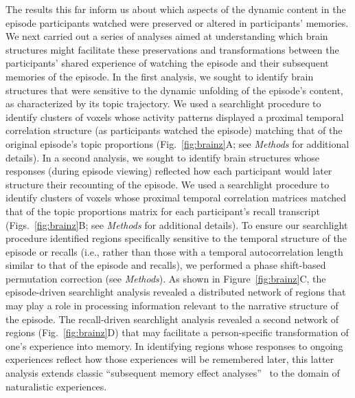 \documentclass[10pt]{article}
\begin{document}
The results this far inform us about which aspects of the dynamic content in the episode participants watched were preserved or altered in participants' memories.  We next carried out a series of analyses aimed at understanding which brain structures might facilitate these preservations and transformations between the participants' shared experience of watching the episode and their subsequent memories of the episode.  In the first analysis, we sought to identify brain structures that were sensitive to the dynamic unfolding of the episode's content, as characterized by its topic trajectory.  We used a searchlight procedure to identify clusters of voxels whose activity patterns displayed a proximal temporal correlation structure (as participants watched the episode) matching that of the original episode's topic proportions (Fig.~\ref{fig:brainz}A; see \textit{Methods} for additional details).  In a second analysis, we sought to identify brain structures whose responses (during episode viewing) reflected how each participant would later structure their recounting of the episode.  We used a searchlight procedure to identify clusters of voxels whose proximal temporal correlation matrices matched that of the topic proportions matrix for each participant's recall transcript (Figs.~\ref{fig:brainz}B; see \textit{Methods} for additional details).  To ensure our searchlight procedure identified regions specifically sensitive to the temporal structure of the episode or recalls (i.e., rather than those with a temporal autocorrelation length similar to that of the episode and recalls), we performed a phase shift-based permutation correction (see \textit{Methods}). As shown in Figure~\ref{fig:brainz}C, the episode-driven searchlight analysis revealed a distributed network of regions that may play a role in processing information relevant to the narrative structure of the episode.  The recall-driven searchlight analysis revealed a second network of regions (Fig.~\ref{fig:brainz}D) that may facilitate a person-specific transformation of one's experience into memory.  In identifying regions whose responses to ongoing experiences reflect how those experiences will be remembered later, this latter analysis extends classic ``subsequent memory effect analyses''~\citep{PallWagn02} to the domain of naturalistic experiences.
\end{document}
